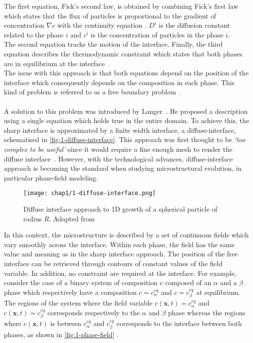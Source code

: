     The first equation, Fick's second law, is obtained by combining Fick's first law which states that the flux of particles is proportional to the gradient of concentration $\nabla c$ with the continuity equation \cite{Gottstein2004}. $D^i$ is the diffusion constant related to the phase $i$ and $c^i$ is the concentration of particles in the phase $i$.\\
    The second equation tracks the motion of the interface. Finally, the third equation describes the thermodynamic constraint which states that both phases are in equilibrium at the interface\ \cite{Voorhees2018, Gottstein2004,Emmerich2008, LeeHuhJeongShinYunKim2014,MoelansBlanpainWollants2008}.\\
    The issue with this approach is that both equations depend on the position of the interface which consequently depends on the composition in each phase. This kind of problem is referred to as a free boundary problem\ \cite{JokisaariVoorheesGuyerWarrenHeinonen2017}.\\\\
    A solution to this problem was introduced by Langer\ \cite{LangerBaronMiller1975}. He proposed a description using a single equation which holds true in the entire domain. To achieve this, the sharp interface is approximated by a finite width interface, a diffuse-interface, schematised in \autoref{fig:1-diffuse-interface}. This approach was first thought to be \textit{`too complex to be useful'} since it would require a fine enough mesh to render the diffuse interface\ \cite{Voorhees2018}. However, with the technological advances, diffuse-interface approach is becoming the standard when studying microstructural evolution, in particular phase-field modeling.
    \begin{figure}[H]
        \centering
        \texttt{[image: chap1/1-diffuse-interface.png]}
        \caption{Diffuse interface approach to 1D growth of a spherical particle of radius $R$. Adapted from \cite{Voorhees2018,MoelansBlanpainWollants2008}}
        \label{fig:1-diffuse-interface}
    \end{figure}
    In this context, the microstructure is described by a set of continuous fields which vary smoothly across the interface. Within each phase, the field has the same value and meaning as in the sharp interface approach. The position of the free interface can be retrieved through contours of constant values of the field variable. In addition, no constraint are required at the interface. For example, consider the case of a binary system of composition $c$ composed of an $\alpha$ and a $\beta$ phase which respectively have a composition $c=c_\alpha^{eq}$ and $c=c_\beta^{eq}$ at equilibrium. The regions of the system where the field variable $c(\mathbf{x}, t)=c_\alpha^{eq}$ and $c(\mathbf{x}, t)=c_\beta^{eq}$ corresponds respectively to the $\alpha$ and $\beta$ phase whereas the regions where $c(\mathbf{x},t)$ is between $c_\alpha^{eq}$ and $c_\beta^{eq}$ corresponds to the interface between both phases, as shown in \autoref{fig:1-phase-field} \cite{LeeHuhJeongShinYunKim2014}.
